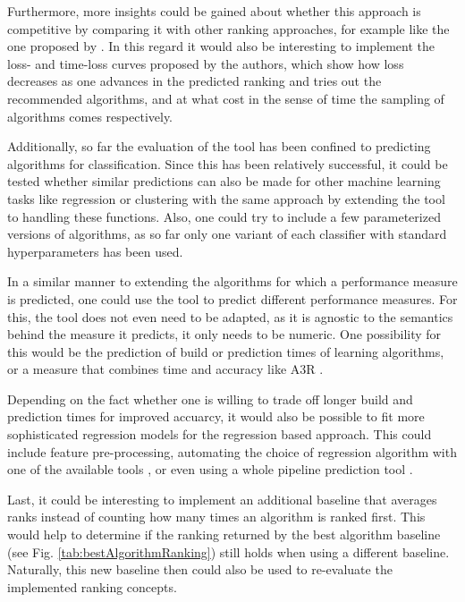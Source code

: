 Furthermore, more insights could be gained about whether this approach is competitive by comparing it with other ranking approaches, for example like the one proposed by \citeauthor{DBLP:journals/ml/AbdulrahmanBRV18} \cite{DBLP:journals/ml/AbdulrahmanBRV18}. In this regard it would also be interesting  to implement the loss- and time-loss curves proposed by the authors, which show how loss decreases as one advances in the predicted ranking and tries out the recommended algorithms, and at what cost in the sense of time the sampling of algorithms comes respectively.

Additionally, so far the evaluation of the tool has been confined to predicting algorithms for classification. Since this has been relatively successful, it could be tested whether similar predictions can also be made for other machine learning tasks like regression or clustering with the same approach by extending the tool to handling these functions. Also, one could try to include a few parameterized versions of algorithms, as so far only one variant of each classifier with standard hyperparameters has been used. 

In a similar manner to extending the algorithms for which a performance measure is predicted, one could use the tool to predict different performance measures. For this, the tool does not even need to be adapted, as it is agnostic to the semantics behind the measure it predicts, it only needs to be numeric. One possibility for this would be the prediction of build or prediction times of learning algorithms, or a measure that combines time and accuracy like A3R \cite{DBLP:journals/ml/AbdulrahmanBRV18}.

Depending on the fact whether one is willing to trade off longer build and prediction times for improved accuarcy, it would also be possible to fit more sophisticated regression models for the regression based approach. This could include feature pre-processing, automating the choice of regression algorithm with one of the available tools \cite{thornton2013auto} \cite{feurer2015efficient}, or even using a whole pipeline prediction tool \cite{wever2017automatic} \cite{DBLP:conf/eurogp/SaPOP17}. 

Last, it could be interesting to implement an additional baseline that averages ranks instead of counting how many times an algorithm is ranked first. This would help to determine if the ranking returned by the best algorithm baseline (see Fig. \ref{tab:bestAlgorithmRanking}) still holds when using a different baseline. Naturally, this new baseline then could also be used to re-evaluate the implemented ranking concepts. 



